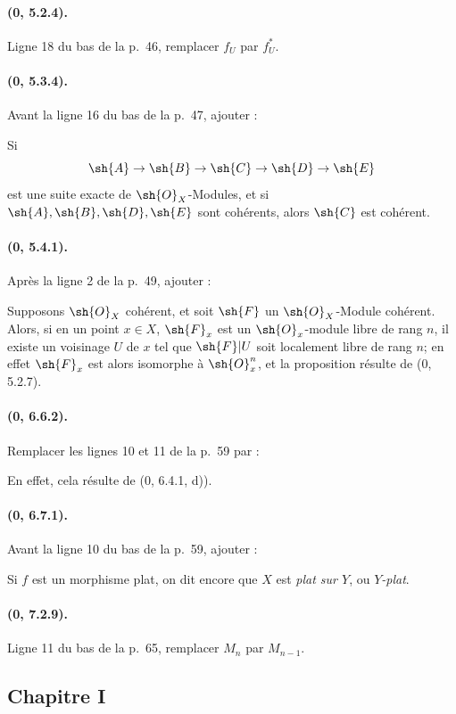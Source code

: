 \paragraph{(0, 5.2.4).}
Ligne 18 du bas de la p.~46, remplacer $f_U$ par $f_U^*$.

\paragraph{(0, 5.3.4).}
Avant la ligne 16 du bas de la p.~47, ajouter :

Si
\[
  \sh{A}\to\sh{B}\to\sh{C}\to\sh{D}\to\sh{E}
\]
est une suite exacte de $\sh{O}_X$-Modules, et si
$\sh{A},\sh{B},\sh{D},\sh{E}$ sont cohérents, alors $\sh{C}$ est
cohérent.

\paragraph{(0, 5.4.1).}
Après la ligne 2 de la p.~49, ajouter :

Supposons $\sh{O}_X$ cohérent, et soit $\sh{F}$ un $\sh{O}_X$-Module
cohérent. Alors, si en un point $x\in X$, $\sh{F}_x$ est un
$\sh{O}_x$-module libre de rang $n$, il existe un voisinage $U$ de $x$
tel que $\sh{F}|U$ soit localement libre de rang $n$; en effet
$\sh{F}_x$ est alors isomorphe à $\sh{O}_x^n$, et la proposition résulte
de (0, 5.2.7).

\paragraph{(0, 6.6.2).}
Remplacer les lignes 10 et 11 de la p.~59 par :

En effet, cela résulte de (0, 6.4.1, d)).

\paragraph{(0, 6.7.1).}
Avant la ligne 10 du bas de la p.~59, ajouter :

Si $f$ est un morphisme plat, on dit encore que $X$ est \emph{plat sur
$Y$}, ou \emph{$Y$-plat}.

\paragraph{(0, 7.2.9).}
Ligne 11 du bas de la p.~65, remplacer $M_n$ par $M_{n-1}$.

\subsection*{Chapitre I}

